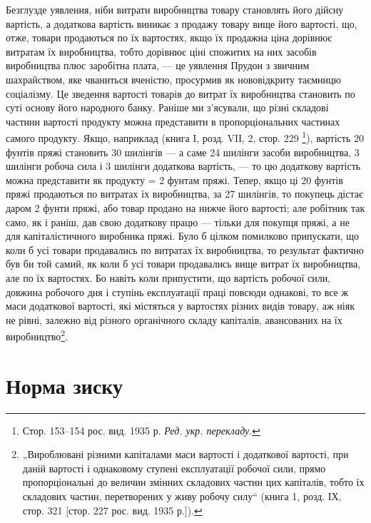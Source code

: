 
Безглузде уявлення, ніби витрати виробництва товару становлять
його дійсну вартість, а додаткова вартість виникає
з продажу товару вище його вартості, що, отже, товари продаються
по їх вартостях, якщо їх продажна ціна дорівнює витратам
їх виробництва, тобто дорівнює ціні спожитих на них
засобів виробництва плюс заробітна плата, — це уявлення Прудон
з звичним шахрайством, яке чваниться вченістю, просурмив
як нововідкриту таємницю соціалізму. Це зведення вартості
товарів до витрат їх виробництва становить по суті
основу його народного банку. Раніше ми з’ясували, що різні складові
частини вартості продукту можна представити в пропорціональних
частинах самого продукту. Якщо, наприклад (книга І,
розд. VIІ, 2, стор. 229 \footnote*{
Стор. 153--154 рос. вид. 1935 р. \emph{Ред. укр. перекладу}.
}), вартість 20 фунтів пряжі становить
30 шилінгів — а саме 24 шилінги засоби виробництва, 3 шилінги
робоча сила і 3 шилінги додаткова вартість, — то цю додаткову
вартість можна представити як  продукту = 2 фунтам пряжі.
Тепер, якщо ці 20 фунтів пряжі продаються по витратах їх
виробництва, за 27 шилінгів, то покупець дістає даром 2 фунти
пряжі, або товар продано на   нижче його вартості; але робітник
так само, як і раніш, дав свою додаткову працю — тільки
для покупця пряжі, а не для капіталістичного виробника пряжі.
Було б цілком помилково припускати, що коли б усі товари
продавались по витратах їх виробництва, то результат фактично
був би той самий, як коли б усі товари продавались вище витрат
їх виробництва, але по їх вартостях. Бо навіть коли припустити,
що вартість робочої сили, довжина робочого дня
і ступінь експлуатації праці повсюди однакові, то все ж маси
додаткової вартості, які містяться у вартостях різних видів
товару, аж ніяк не рівні, залежно від різного органічного складу
капіталів, авансованих на їх виробництво\footnote{
„Вироблювані різними капіталами маси вартості і додаткової вартості, при
даній вартості і однаковому ступені експлуатації робочої сили, прямо пропорціональні
до величин змінних складових частин цих капіталів, тобто їх складових
частин, перетворених у живу робочу силу“ (книга 1, розд. ІХ, стор. 321
[стор. 227 рос. вид. 1935 р.]).
}.

\section{Норма зиску}

